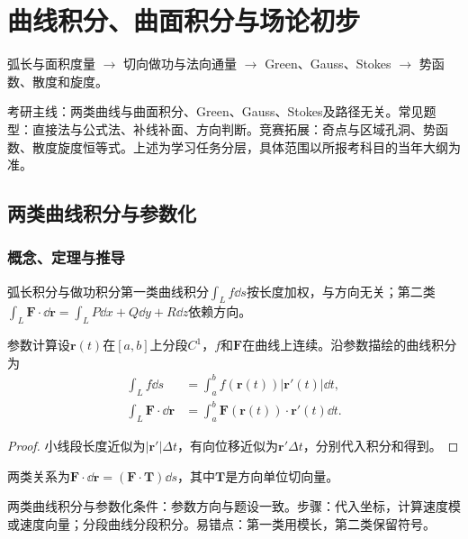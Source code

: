 \chapter{曲线积分、曲面积分与场论初步}\label{ch:8}
\begin{tcolorbox}[title=章首知识地图,colframe=Ink]
弧长与面积度量 $\to$ 切向做功与法向通量 $\to$ Green、Gauss、Stokes $\to$ 势函数、散度和旋度。
\end{tcolorbox}
\begin{examtip}考研主线：两类曲线与曲面积分、Green、Gauss、Stokes及路径无关。常见题型：直接法与公式法、补线补面、方向判断。竞赛拓展：奇点与区域孔洞、势函数、散度旋度恒等式。上述为学习任务分层，具体范围以所报考科目的当年大纲为准。\end{examtip}
\section{两类曲线积分与参数化}\label{sec:8:1}
\subsection{概念、定理与推导}

\begin{definition}{弧长积分与做功积分}第一类曲线积分$\int_Lf\dd s$按长度加权，与方向无关；第二类$\int_L\bm F\cdot\dd\bm r=\int_LP\dd x+Q\dd y+R\dd z$依赖方向。\end{definition}
\begin{theorem}{参数计算}设$\bm r(t)$在$[a,b]$上分段$C^1$，$f$和$\bm F$在曲线上连续。沿参数描绘的曲线积分为
\begin{align}\int_Lf\dd s&=\int_a^bf(\bm r(t))|\bm r\prime(t)|\dd t,\\
\int_L\bm F\cdot\dd\bm r&=\int_a^b\bm F(\bm r(t))\cdot\bm r\prime(t)\dd t.\end{align}
\end{theorem}
\begin{proof}小线段长度近似为$|\bm r\prime|\Delta t$，有向位移近似为$\bm r\prime\Delta t$，分别代入积分和得到。\end{proof}
两类关系为$\bm F\cdot\dd\bm r=(\bm F\cdot\bm T)\dd s$，其中$\bm T$是方向单位切向量。

\begin{method}{两类曲线积分与参数化}条件：参数方向与题设一致。步骤：代入坐标，计算速度模或速度向量；分段曲线分段积分。易错点：第一类用模长，第二类保留符号。\end{method}
